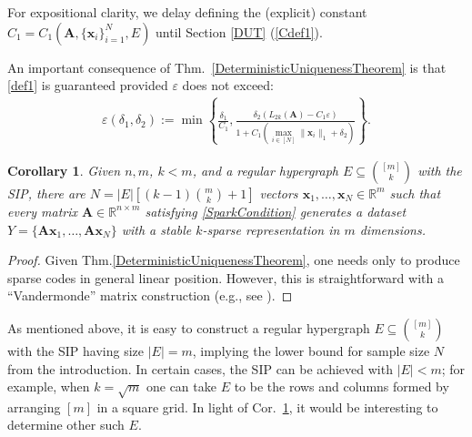\documentclass[9pt,twocolumn]{pnas-new}
\newtheorem{proposition}{Proposition}
\newtheorem{corollary}{Corollary}
\begin{document}
For expositional clarity, we delay defining the (explicit) constant $C_1 = C_1(\mathbf{A}, \{\mathbf{x}_i\}_{i=1}^N, E)$ until Section \ref{DUT} (\eqref{Cdef1}).  %

An important consequence of Thm.~\ref{DeterministicUniquenessTheorem} is that \eqref{def1} is guaranteed provided $\varepsilon$ does not exceed: %
\begin{align}\label{epsdel}
\varepsilon(\delta_1, \delta_2) := \min \left\{ \frac{\delta_1}{ C_1 }, \frac{ \delta_2 (L_{2k}(\mathbf{A}) -  C_1\varepsilon)}{ 1 + C_1 \left( \max_{i \in [N]} \|\mathbf{x}_i\|_1  + \delta_2 \right) } \right\}.
\end{align}


\begin{corollary}\label{DeterministicUniquenessCorollary}
Given $n, m$, $k < m$, and a regular hypergraph $E \subseteq {[m] \choose k}$ with the SIP, there are $N =  |E| \left[ (k-1){m \choose k} + 1  \right]$ vectors \mbox{$\mathbf{x}_1, \ldots, \mathbf{x}_N \in \mathbb{R}^m$} such that every matrix $\mathbf{A} \in \mathbb{R}^{n \times m}$ satisfying \eqref{SparkCondition} generates a dataset $Y = \{\mathbf{A}\mathbf{x}_1, \ldots, \mathbf{A}\mathbf{x}_N\}$ with a stable $k$-sparse representation in $m$ dimensions.
\end{corollary}
\begin{proof}
Given Thm.\ref{DeterministicUniquenessTheorem}, one needs only to produce sparse codes in general linear position.  However, this is straightforward with a ``Vandermonde'' matrix construction (e.g., see \cite{Hillar15}).
\end{proof}

As mentioned above, it is easy to construct a regular hypergraph $E \subseteq {[m] \choose k}$ with the SIP having size $|E| = m$, implying the lower bound for sample size $N$ from the introduction. In certain cases, the SIP can be achieved with $|E| < m$; for example, when $k = \sqrt{m}$ one can take $E$ to be the rows and columns formed by arranging $[m]$ in a square grid.  In light of Cor.~\ref{DeterministicUniquenessCorollary}, it would be interesting to determine other such $E$. %
\end{document}
